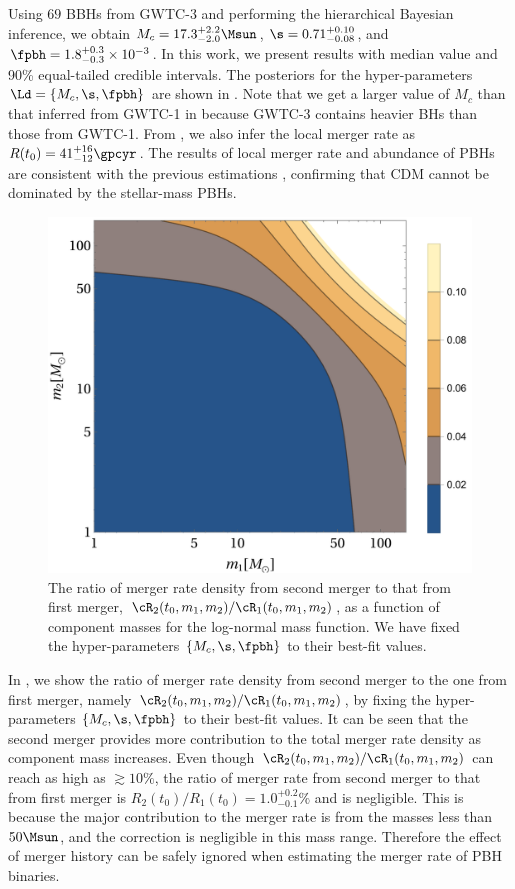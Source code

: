 \documentclass[
reprint,           %
superscriptaddress,%
amsmath,           %
amssymb,           %
aps,               %
prd,               %
notitlepage,       %
longbibliography,  %
floatfix,          %
nofootinbib,
]{revtex4-1}
\begin{document}
Using $69$ BBHs from GWTC-3 and performing the hierarchical Bayesian inference, we obtain $M_c = 17.3^{+2.2}_{-2.0} \Msun$, $\s = 0.71^{+0.10}_{-0.08}$, and $\fpbh = 1.8^{+0.3}_{-0.3} \times 10^{-3}$. In this work, we present results with median value and 90\% equal-tailed credible intervals. The posteriors for the hyper-parameters $\Ld = \{M_c, \s, \fpbh\}$ are shown in . Note that we get a larger value of $M_c$ than that inferred from GWTC-1 in \cite{Wu:2020drm} because GWTC-3 contains heavier BHs than those from GWTC-1. From , we also infer the local merger rate as $R(t_0) = 41^{+16}_{-12} \gpcyr$. The results of local merger rate and abundance of PBHs are consistent with the previous estimations \cite{Chen:2018czv,Chen:2018rzo,Chen:2019irf,Wu:2020drm,Chen:2021nxo,Chen:2022fda}, confirming that CDM cannot be dominated by the stellar-mass PBHs.

\begin{figure}[tbp!]
	\centering
	\includegraphics[width=\linewidth]{ratio-log.pdf}
	\caption{\label{ratio-log}The ratio of merger rate density from second merger to that from first merger, $\cR_2(t_0, m_1, m_2)/\cR_1(t_0, m_1, m_2)$, as a function of component masses for the log-normal mass function. We have fixed the hyper-parameters $\{M_c, \s, \fpbh\}$ to their best-fit values.}
\end{figure}


In , we show the ratio of merger rate density from second merger to the one from first merger, namely $\cR_2(t_0, m_1, m_2)/\cR_1(t_0, m_1, m_2)$, by fixing the hyper-parameters $\{M_c, \s, \fpbh\}$ to their best-fit values. It can be seen that the second merger provides more contribution to the total merger rate density as component mass increases. Even though $\cR_2(t_0, m_1, m_2)/\cR_1(t_0, m_1, m_2)$ can reach as high as $\gtrsim 10\%$, the ratio of merger rate from second merger to that from first merger is $R_2(t_0)/R_1(t_0) = 1.0^{+0.2}_{-0.1}\%$ and is negligible. This is because the major contribution to the merger rate is from the masses less than $50\Msun$, and the correction is negligible in this mass range. Therefore the effect of merger history can be safely ignored when estimating the merger rate of PBH binaries.
\end{document}
